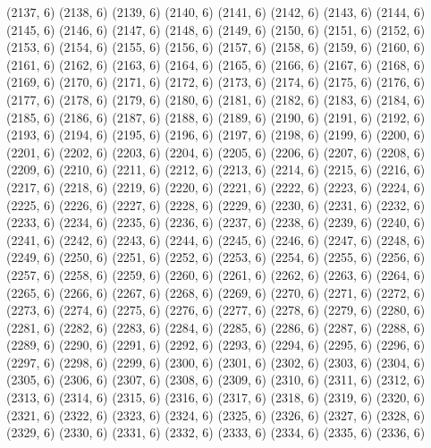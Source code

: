 {   (2137, 6)
   (2138, 6)
   (2139, 6)
   (2140, 6)
   (2141, 6)
   (2142, 6)
   (2143, 6)
   (2144, 6)
   (2145, 6)
   (2146, 6)
   (2147, 6)
   (2148, 6)
   (2149, 6)
   (2150, 6)
   (2151, 6)
   (2152, 6)
   (2153, 6)
   (2154, 6)
   (2155, 6)
   (2156, 6)
   (2157, 6)
   (2158, 6)
   (2159, 6)
   (2160, 6)
   (2161, 6)
   (2162, 6)
   (2163, 6)
   (2164, 6)
   (2165, 6)
   (2166, 6)
   (2167, 6)
   (2168, 6)
   (2169, 6)
   (2170, 6)
   (2171, 6)
   (2172, 6)
   (2173, 6)
   (2174, 6)
   (2175, 6)
   (2176, 6)
   (2177, 6)
   (2178, 6)
   (2179, 6)
   (2180, 6)
   (2181, 6)
   (2182, 6)
   (2183, 6)
   (2184, 6)
   (2185, 6)
   (2186, 6)
   (2187, 6)
   (2188, 6)
   (2189, 6)
   (2190, 6)
   (2191, 6)
   (2192, 6)
   (2193, 6)
   (2194, 6)
   (2195, 6)
   (2196, 6)
   (2197, 6)
   (2198, 6)
   (2199, 6)
   (2200, 6)
   (2201, 6)
   (2202, 6)
   (2203, 6)
   (2204, 6)
   (2205, 6)
   (2206, 6)
   (2207, 6)
   (2208, 6)
   (2209, 6)
   (2210, 6)
   (2211, 6)
   (2212, 6)
   (2213, 6)
   (2214, 6)
   (2215, 6)
   (2216, 6)
   (2217, 6)
   (2218, 6)
   (2219, 6)
   (2220, 6)
   (2221, 6)
   (2222, 6)
   (2223, 6)
   (2224, 6)
   (2225, 6)
   (2226, 6)
   (2227, 6)
   (2228, 6)
   (2229, 6)
   (2230, 6)
   (2231, 6)
   (2232, 6)
   (2233, 6)
   (2234, 6)
   (2235, 6)
   (2236, 6)
   (2237, 6)
   (2238, 6)
   (2239, 6)
   (2240, 6)
   (2241, 6)
   (2242, 6)
   (2243, 6)
   (2244, 6)
   (2245, 6)
   (2246, 6)
   (2247, 6)
   (2248, 6)
   (2249, 6)
   (2250, 6)
   (2251, 6)
   (2252, 6)
   (2253, 6)
   (2254, 6)
   (2255, 6)
   (2256, 6)
   (2257, 6)
   (2258, 6)
   (2259, 6)
   (2260, 6)
   (2261, 6)
   (2262, 6)
   (2263, 6)
   (2264, 6)
   (2265, 6)
   (2266, 6)
   (2267, 6)
   (2268, 6)
   (2269, 6)
   (2270, 6)
   (2271, 6)
   (2272, 6)
   (2273, 6)
   (2274, 6)
   (2275, 6)
   (2276, 6)
   (2277, 6)
   (2278, 6)
   (2279, 6)
   (2280, 6)
   (2281, 6)
   (2282, 6)
   (2283, 6)
   (2284, 6)
   (2285, 6)
   (2286, 6)
   (2287, 6)
   (2288, 6)
   (2289, 6)
   (2290, 6)
   (2291, 6)
   (2292, 6)
   (2293, 6)
   (2294, 6)
   (2295, 6)
   (2296, 6)
   (2297, 6)
   (2298, 6)
   (2299, 6)
   (2300, 6)
   (2301, 6)
   (2302, 6)
   (2303, 6)
   (2304, 6)
   (2305, 6)
   (2306, 6)
   (2307, 6)
   (2308, 6)
   (2309, 6)
   (2310, 6)
   (2311, 6)
   (2312, 6)
   (2313, 6)
   (2314, 6)
   (2315, 6)
   (2316, 6)
   (2317, 6)
   (2318, 6)
   (2319, 6)
   (2320, 6)
   (2321, 6)
   (2322, 6)
   (2323, 6)
   (2324, 6)
   (2325, 6)
   (2326, 6)
   (2327, 6)
   (2328, 6)
   (2329, 6)
   (2330, 6)
   (2331, 6)
   (2332, 6)
   (2333, 6)
   (2334, 6)
   (2335, 6)
   (2336, 6)
}
